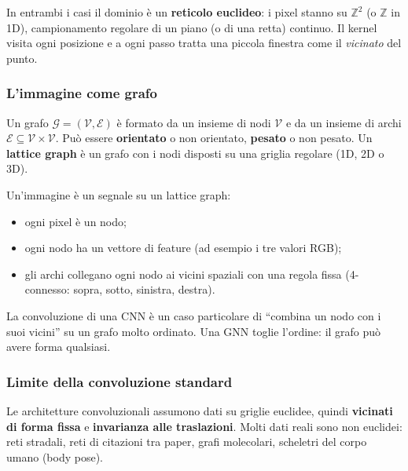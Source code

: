 \documentclass[11pt,a4paper]{article}
\begin{document}
In entrambi i casi il dominio è un \textbf{reticolo euclideo}: i pixel stanno su
$\mathbb{Z}^2$ (o $\mathbb{Z}$ in 1D), campionamento regolare di un piano
(o di una retta) continuo. Il kernel visita ogni posizione e a ogni passo
tratta una piccola finestra come il \emph{vicinato} del punto.
 
\subsubsection{L'immagine come grafo}
\begin{definizione}[Grafo]
Un grafo $\mathcal{G}=(\mathcal{V},\mathcal{E})$ è formato da un insieme di
nodi $\mathcal{V}$ e da un insieme di archi $\mathcal{E}\subseteq\mathcal{V}\times\mathcal{V}$.
Può essere \textbf{orientato} o non orientato, \textbf{pesato} o non pesato.
Un \textbf{lattice graph} è un grafo con i nodi disposti su una griglia regolare
(1D, 2D o 3D).
\end{definizione}
 
Un'immagine è un segnale su un lattice graph:
\begin{itemize}
  \item ogni pixel è un nodo;
  \item ogni nodo ha un vettore di feature (ad esempio i tre valori RGB);
  \item gli archi collegano ogni nodo ai vicini spaziali con una regola fissa
        (4-connesso: sopra, sotto, sinistra, destra).
\end{itemize}
 
\begin{osservazione}[Conseguenza]
La convoluzione di una CNN è un caso particolare di ``combina un nodo con i suoi
vicini'' su un grafo molto ordinato. Una GNN toglie l'ordine: il grafo può avere
forma qualsiasi.
\end{osservazione}
 
\subsubsection{Limite della convoluzione standard}
Le architetture convoluzionali assumono dati su griglie euclidee, quindi
\textbf{vicinati di forma fissa} e \textbf{invarianza alle traslazioni}.
Molti dati reali sono non euclidei: reti stradali, reti di citazioni tra paper,
grafi molecolari, scheletri del corpo umano (body pose).
 
\end{document}
